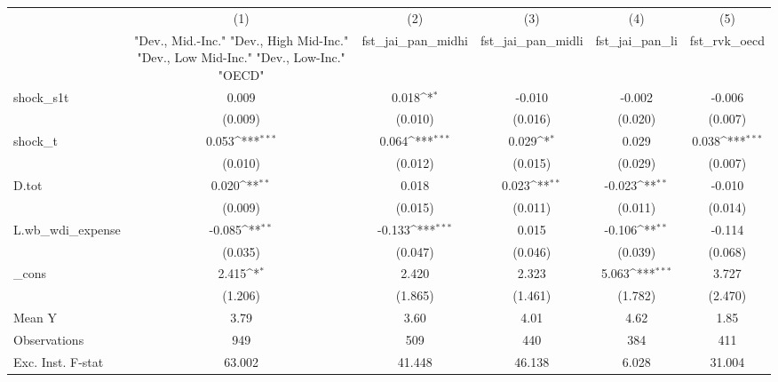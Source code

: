 {
\def\sym#1{\ifmmode^{#1}\else\(^{#1}\)\fi}
\begin{tabular}{l*{5}{c}}
\toprule
            &\multicolumn{1}{c}{(1)}&\multicolumn{1}{c}{(2)}&\multicolumn{1}{c}{(3)}&\multicolumn{1}{c}{(4)}&\multicolumn{1}{c}{(5)}\\
            &\multicolumn{1}{c}{ "Dev., Mid.-Inc." "Dev., High Mid-Inc." "Dev., Low Mid-Inc." "Dev., Low-Inc." "OECD" }&\multicolumn{1}{c}{fst\_jai\_pan\_midhi}&\multicolumn{1}{c}{fst\_jai\_pan\_midli}&\multicolumn{1}{c}{fst\_jai\_pan\_li}&\multicolumn{1}{c}{fst\_rvk\_oecd}\\
\midrule
shock\_s1t   &       0.009         &       0.018\sym{*}  &      -0.010         &      -0.002         &      -0.006         \\
            &     (0.009)         &     (0.010)         &     (0.016)         &     (0.020)         &     (0.007)         \\
\addlinespace
shock\_t     &       0.053\sym{***}&       0.064\sym{***}&       0.029\sym{*}  &       0.029         &       0.038\sym{***}\\
            &     (0.010)         &     (0.012)         &     (0.015)         &     (0.029)         &     (0.007)         \\
\addlinespace
D.tot       &       0.020\sym{**} &       0.018         &       0.023\sym{**} &      -0.023\sym{**} &      -0.010         \\
            &     (0.009)         &     (0.015)         &     (0.011)         &     (0.011)         &     (0.014)         \\
\addlinespace
L.wb\_wdi\_expense&      -0.085\sym{**} &      -0.133\sym{***}&       0.015         &      -0.106\sym{**} &      -0.114         \\
            &     (0.035)         &     (0.047)         &     (0.046)         &     (0.039)         &     (0.068)         \\
\addlinespace
\_cons      &       2.415\sym{*}  &       2.420         &       2.323         &       5.063\sym{***}&       3.727         \\
            &     (1.206)         &     (1.865)         &     (1.461)         &     (1.782)         &     (2.470)         \\
\midrule
Mean Y      &        3.79         &        3.60         &        4.01         &        4.62         &        1.85         \\
Observations&         949         &         509         &         440         &         384         &         411         \\
Exc. Inst. F-stat&      63.002         &      41.448         &      46.138         &       6.028         &      31.004         \\
\bottomrule
\end{tabular}
}
